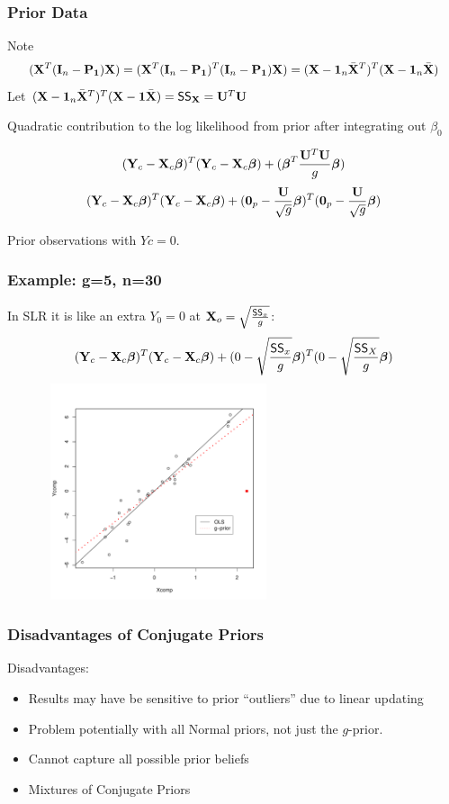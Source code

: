 \documentclass[]{beamer}\usepackage[]{graphicx}\usepackage[]{color}
\newenvironment{knitrout}{}{} %
\begin{document}
\begin{frame}\frametitle{Prior Data}
Note $$(\mathbf{X}^T (\mathbf{I}_n - \mathbf{P}_{\mathbf{1}}) \mathbf{X}) = (\mathbf{X}^T (\mathbf{I}_n - \mathbf{P}_{\mathbf{1}})^T (\mathbf{I}_n
- \mathbf{P}_{\mathbf{1}}) \mathbf{X})  = (\mathbf{X} -\mathbf{1}_n \bar{\mathbf{X}}^T)^T (\mathbf{X} - \mathbf{1}_n \bar{\mathbf{X}}) $$
\pause
Let  $(\mathbf{X} -\mathbf{1}_n \bar{\mathbf{X}}^T)^T (\mathbf{X} - \mathbf{1} \bar{\mathbf{X}}) = \textsf{SS}_{\mathbf{X}} = \mathbf{U}^T \mathbf{U}$
\pause

Quadratic contribution to the log likelihood from prior after integrating out $\beta_0$

$$ ( \mathbf{Y}_c  - \mathbf{X}_c \boldsymbol{\beta})^T(\mathbf{Y}_c - \mathbf{X}_c\boldsymbol{\beta}) + ( \boldsymbol{\beta}^T\frac{\mathbf{U}^T \mathbf{U}}{g} \boldsymbol{\beta})   $$
\pause
$$ ( \mathbf{Y}_c  - \mathbf{X}_c \boldsymbol{\beta})^T(\mathbf{Y}_c - \mathbf{X}_c\boldsymbol{\beta}) + ( \mathbf{0}_p -
\frac{\mathbf{U}}{\sqrt{g}}\boldsymbol{\beta})^T(\mathbf{0}_p -  \frac{\mathbf{U}}{\sqrt{g}} \boldsymbol{\beta})   $$

Prior observations  with $Yc =  0$.
\end{frame}


\begin{frame}\frametitle{Example: g=5, n=30}

In SLR it is like an extra $Y_0 = 0$ at $\mathbf{X}_o = \sqrt{\frac{\textsf{SS}_x}{g}}$:
$$ ( \mathbf{Y}_c  - \mathbf{X}_c \boldsymbol{\beta})^T(\mathbf{Y}_c - \mathbf{X}_c\boldsymbol{\beta}) + (0 - \sqrt{\frac{\textsf{SS}_x}{g}}\boldsymbol{\beta})^T (0 - \sqrt{\frac{\textsf{SS}_X}{g}} \boldsymbol{\beta})   $$
\pause
\begin{knitrout}
\color{fgcolor}
\includegraphics[width=3.5in,height=2.5in]{figure/simdata-1} 

\end{knitrout}


\end{frame}



\begin{frame}
  \frametitle{Disadvantages of Conjugate Priors}
  Disadvantages: \pause
\begin{itemize}
\item Results  may have be sensitive to prior ``outliers'' due to
  linear updating \pause
\item Problem potentially with all Normal priors, not just the
  $g$-prior. \pause
\item Cannot capture all possible prior beliefs \pause
\item Mixtures of Conjugate Priors
\end{itemize}
\end{frame}
\end{document}

